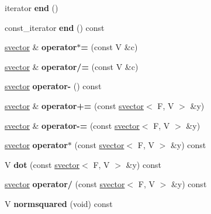 \begin{DoxyCompactItemize}
\item 
\hypertarget{classsvector_a35b2c7f05af13cb957af871cedcc5e00}{
iterator {\bfseries end} ()}
\label{classsvector_a35b2c7f05af13cb957af871cedcc5e00}

\item 
\hypertarget{classsvector_ad40a20f476d65891c06db88f7b43c12e}{
const\_\-iterator {\bfseries end} () const }
\label{classsvector_ad40a20f476d65891c06db88f7b43c12e}

\item 
\hypertarget{classsvector_a6dad0388185b81076751d6dad78e3fbf}{
\hyperlink{classsvector}{svector} \& {\bfseries operator$\ast$=} (const V \&c)}
\label{classsvector_a6dad0388185b81076751d6dad78e3fbf}

\item 
\hypertarget{classsvector_a5cffef009f0233103409edd38d658d11}{
\hyperlink{classsvector}{svector} \& {\bfseries operator/=} (const V \&c)}
\label{classsvector_a5cffef009f0233103409edd38d658d11}

\item 
\hypertarget{classsvector_aea1f3107cc825f39969674dbe609a12a}{
\hyperlink{classsvector}{svector} {\bfseries operator-\/} () const }
\label{classsvector_aea1f3107cc825f39969674dbe609a12a}

\item 
\hypertarget{classsvector_a5420004342894baf43b5811f8a49dd22}{
\hyperlink{classsvector}{svector} \& {\bfseries operator+=} (const \hyperlink{classsvector}{svector}$<$ F, V $>$ \&y)}
\label{classsvector_a5420004342894baf43b5811f8a49dd22}

\item 
\hypertarget{classsvector_a141a4f013fb63eb81bf297c048a0e133}{
\hyperlink{classsvector}{svector} \& {\bfseries operator-\/=} (const \hyperlink{classsvector}{svector}$<$ F, V $>$ \&y)}
\label{classsvector_a141a4f013fb63eb81bf297c048a0e133}

\item 
\hypertarget{classsvector_a71e1ccf9f794dcc7ec2cf749bdcd2e23}{
\hyperlink{classsvector}{svector} {\bfseries operator$\ast$} (const \hyperlink{classsvector}{svector}$<$ F, V $>$ \&y) const }
\label{classsvector_a71e1ccf9f794dcc7ec2cf749bdcd2e23}

\item 
\hypertarget{classsvector_a0a5aaef6f64ca6a66e25880b445b3057}{
V {\bfseries dot} (const \hyperlink{classsvector}{svector}$<$ F, V $>$ \&y) const }
\label{classsvector_a0a5aaef6f64ca6a66e25880b445b3057}

\item 
\hypertarget{classsvector_ac72bf8a1d29510edec5e19220733d708}{
\hyperlink{classsvector}{svector} {\bfseries operator/} (const \hyperlink{classsvector}{svector}$<$ F, V $>$ \&y) const }
\label{classsvector_ac72bf8a1d29510edec5e19220733d708}

\item 
\hypertarget{classsvector_ab2252c92adf6656d0bde5aec708a371f}{
V {\bfseries normsquared} (void) const }
\label{classsvector_ab2252c92adf6656d0bde5aec708a371f}

\end{DoxyCompactItemize}
